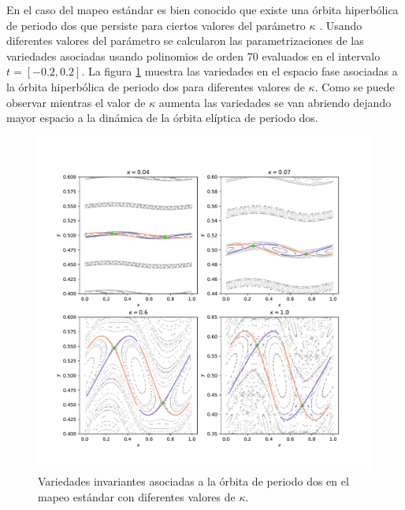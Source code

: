 En el caso del mapeo est\'andar es bien conocido que existe una \'orbita hiperb\'olica de periodo dos que persiste para ciertos valores del par\'ametro $\kappa$ . Usando diferentes valores del par\'ametro se calcularon las parametrizaciones de las variedades asociadas usando polinomios de orden $70$ evaluados en el intervalo $t=[-0.2,0.2]$. La figura \ref{estandarvariedadesperiodo2} muestra las variedades en el espacio fase asociadas a la \'orbita hiperb\'olica de periodo dos para diferentes valores de $\kappa$. Como se puede observar mientras el valor de $\kappa$ aumenta las variedades se van abriendo dejando mayor espacio a la din\'amica de la \'orbita el\'iptica de periodo dos. \\



\begin{figure}
	\centering
	\includegraphics[scale=0.6]{variedadesestandarperiodo2}
	\caption{Variedades invariantes asociadas a la \'orbita de periodo dos en el mapeo est\'andar con diferentes valores de $\kappa$.}
	\label{estandarvariedadesperiodo2}
\end{figure}

